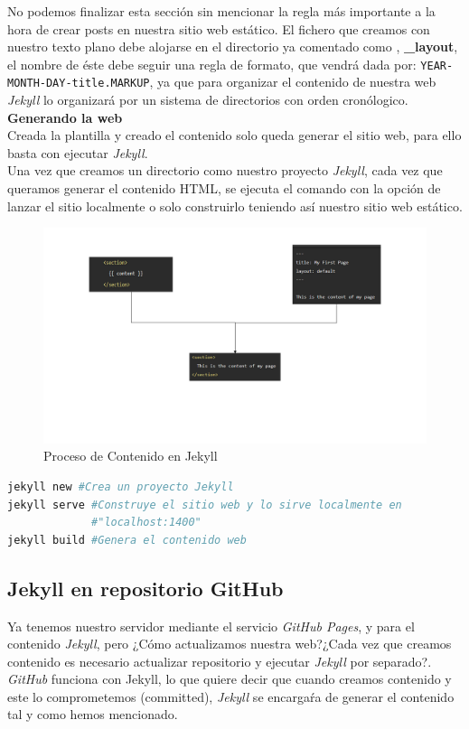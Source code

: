\documentclass[a4paper, 12pt]{book}
\begin{document}
No podemos finalizar esta sección sin mencionar la regla más importante a la hora de crear posts en nuestra sitio web estático. El fichero que creamos con nuestro texto plano debe alojarse en el directorio ya comentado como , \textbf{\_layout}, el nombre de éste debe seguir una regla de formato, que vendrá dada por: \texttt{YEAR-MONTH-DAY-title.MARKUP}, ya que para organizar el contenido de nuestra web \emph{Jekyll} lo organizará por un sistema de directorios con orden cronólogico.  \\
\textbf{\large{Generando la web}}\\
Creada la plantilla y creado el contenido solo queda generar el sitio web, para ello basta con ejecutar \emph{Jekyll}.\\
Una vez que creamos un directorio como nuestro proyecto \emph{Jekyll}, cada vez que queramos generar el contenido HTML, se ejecuta el comando con la opción de lanzar el sitio localmente o solo construirlo teniendo así nuestro sitio web estático. 
\begin{figure}[h]
    \centering
    \includegraphics[width=\textwidth]{img/jekyll_process2.png}
    \caption{Proceso de Contenido en Jekyll}
    \label{fig:jekyllProc2}
\end{figure}
\begin{lstlisting}[language=sh]
jekyll new #Crea un proyecto Jekyll
jekyll serve #Construye el sitio web y lo sirve localmente en     
             #"localhost:1400"
jekyll build #Genera el contenido web
\end{lstlisting}
\subsection*{Jekyll en repositorio GitHub}
\label{subsec:jekandGit}
Ya tenemos nuestro servidor mediante el servicio \emph{GitHub Pages}, y para el contenido \emph{Jekyll}, pero ¿Cómo actualizamos nuestra web?¿Cada vez que creamos contenido es necesario actualizar repositorio y ejecutar \emph{Jekyll} por separado?. \\
\emph{GitHub} funciona con Jekyll, lo que quiere decir que cuando creamos contenido y este lo comprometemos (committed), \emph{Jekyll} se encargaŕa de generar el contenido tal y como hemos mencionado.
\end{document}
